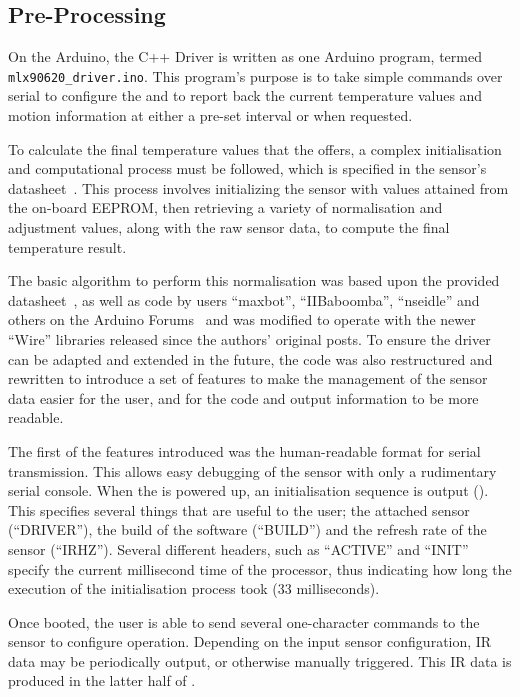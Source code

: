 \documentclass[../thesis/thesis.tex]{subfiles}
\begin{document}
\subsection{Pre-Processing}

On the Arduino, the \tarl C++ Driver is written as one Arduino program, termed \texttt{mlx90620\_driver.ino}. This program's purpose is to take simple commands over serial to configure the \mlx and to report back the current temperature values and \pir motion information at either a pre-set interval or when requested.

To calculate the final temperature values that the \mlx offers, a complex initialisation and computational process must be followed, which is specified in the sensor's datasheet~\cite{MLXDatasheet}. This process involves initializing the sensor with values attained from the on-board EEPROM, then retrieving a variety of normalisation and adjustment values, along with the raw sensor data, to compute the final temperature result.

The basic algorithm to perform this normalisation was based upon the provided datasheet~\cite{MLXDatasheet}, as well as code by users ``maxbot'', ``IIBaboomba'', ``nseidle'' and others on the Arduino Forums~\cite{ArduinoForum} and was modified to operate with the newer \ard ``Wire'' \iic libraries released since the authors' original posts. To ensure the driver can be adapted and extended in the future, the code was also restructured and rewritten to introduce a set of features to make the management of the sensor data easier for the user, and for the code and output information to be more readable.

The first of the features introduced was the human-readable format for serial transmission. This allows easy debugging of the sensor with only a rudimentary serial console. When the \ard is powered up, an initialisation sequence is output (). This specifies several things that are useful to the user; the attached sensor (``DRIVER''), the build of the software (``BUILD'') and the refresh rate of the sensor (``IRHZ''). Several different headers, such as ``ACTIVE'' and ``INIT'' specify the current millisecond time of the processor, thus indicating how long the execution of the initialisation process took (33 milliseconds).

Once booted, the user is able to send several one-character commands to the sensor to configure operation. Depending on the input sensor configuration, IR data may be periodically output, or otherwise manually triggered. This IR data is produced in the latter half of .
\end{document}

